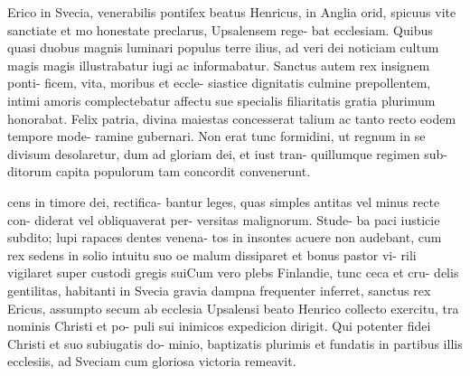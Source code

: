 \documentclass[a4paper, 12pt]{article}
\begin{document}
\newpage


\pagestyle{empty}

\begin{mstextura}
Erico in Svecia, venerabilis
pontifex beatus Henricus, in 
Anglia orid, spicuus vite
sanctiate et mo honestate
preclarus, Upsalensem rege- 
bat ecclesiam. Quibus quasi duobus magnis luminari
populus terre ilius, ad veri
dei noticiam  cultum magis 
magis illustrabatur iugi
ac informabatur. Sanctus 
autem rex insignem ponti- 
ficem, vita, moribus et eccle- siastice dignitatis culmine 
prepollentem, intimi amoris
complectebatur affectu  sue 
specialis filiaritatis gratia 
plurimum honorabat. Felix 
patria,  divina maiestas 
concesserat talium ac tanto 
recto eodem tempore mode- 
ramine gubernari. Non erat 
tunc formidini, ut regnum in 
se divisum desolaretur, dum 
ad gloriam dei, et iust tran- 
quillumque regimen sub- dito{rum} capita populorum 
tam concordit convenerunt. 

cens in timore dei, rectifica- 
bantur leges, {quas} simples 
antitas vel minus recte c{on}-
diderat vel obli{qua}verat per-
versitas maligno{rum}. Stude-
ba paci  iusticie subdito; 
lupi rapaces dentes venena-
tos in insontes acuere non 
audebant, cum rex {se}dens in 
solio intuitu suo oe malum 
dissiparet {et} bonus pastor vi- 
rili vigilaret super custodi 
gregis sui\mspara{}Cum vero plebs 
Finlandie, tunc ceca et cru-
delis gentilitas, habitanti 
in Svecia gravia dampna 
frequenter inferret, sanctus
rex Ericus, assumpto secum 
ab ecclesia Upsalensi beato 
Henrico collecto exercitu, 
tra nominis Christi et po- 
puli sui inimicos expedicion
dirigit. Qui potenter fidei 
Christi et suo subiugatis do- 
minio, baptizatis plurimis 
et fundatis in partibus illis ecclesiis, ad Sveciam cum gloriosa victoria remeavit. 


\end{mstextura}
\end{document}
